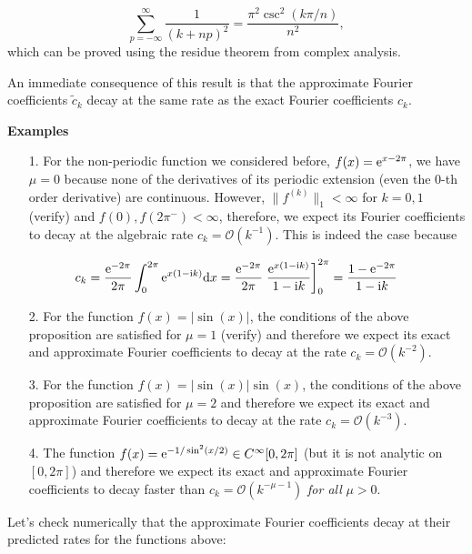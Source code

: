 \documentclass[12pt,a4paper]{article}
\begin{document}
\[
    \sum_{p=-\infty}^{\infty} \frac{1}{(k+np)^2} = \frac{\pi^2\csc^2(k\pi/n) }{n^2},
\]
which can be proved using the residue theorem from complex analysis.

An immediate consequence of this result is that the approximate Fourier coefficients $\widetilde{c}_k$ decay at the same rate as the exact Fourier coefficients $c_k$.

\textbf{Examples}  

\begin{itemize}
\item[1. ] For the non-periodic function we considered before, $f(x) = {\rm e}^{x-2\pi}$, we have $\mu = 0$ because none of the derivatives of its periodic extension (even the $0$-th order derivative) are continuous.  However, $\| f^{(k)} \|_{1} < \infty$ for $k = 0, 1$ (verify) and $f(0), f(2\pi^{-}) < \infty$, therefore, we expect its Fourier coefficients to decay at the algebraic rate $c_k = \mathcal{O}(k^{-1})$. This is indeed the case because

\end{itemize}
\[
c_{k} = \frac{{\rm e}^{-2\pi}}{2\pi}\int_{0}^{2\pi} {\rm e}^{x(1-{\rm i}k)}{\rm d}x = \frac{{\rm e}^{-2\pi}}{2\pi } \left. \frac{{\rm e}^{x(1-{\rm i}k)}}{1-{\rm i}k}   \right]_{0}^{2\pi} = \frac{1 - {\rm e}^{-2\pi}}{1-{\rm i}k}
\]
\begin{itemize}
\item[2. ] For the function $f(x) = \vert \sin(x) \vert$, the conditions of the above proposition are satisfied for $\mu = 1$ (verify) and therefore we expect its exact and approximate Fourier coefficients to decay at the rate $c_k = \mathcal{O}(k^{-2})$.


\item[3. ] For the function $f(x) = \vert \sin(x) \vert \sin(x)$, the conditions of the above proposition are satisfied for $\mu = 2$ and therefore we expect its exact and approximate Fourier coefficients to decay at the rate $c_k = \mathcal{O}(k^{-3})$.


\item[4. ] The function $f(x) = {\rm e}^{-1/\sin^2(x/2)} \in C^{\infty}[0, 2\pi]$ (but it is not analytic on $[0, 2\pi]$) and therefore we expect its exact and approximate Fourier coefficients to decay faster than $c_k = \mathcal{O}(k^{-\mu-1})$ \emph{for all} $\mu > 0$.

\end{itemize}
Let's check numerically that the approximate Fourier coefficients decay at their predicted rates for the functions above:
\end{document}
